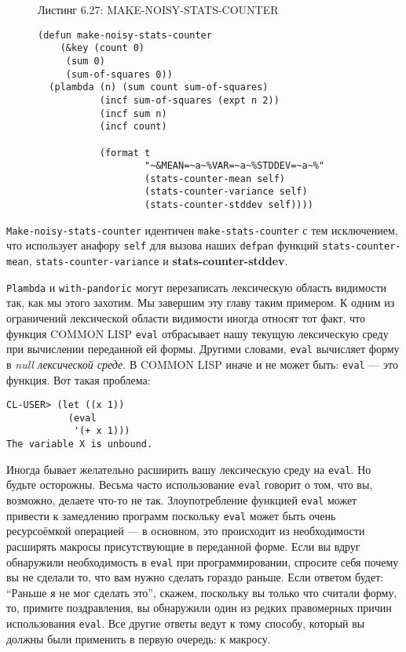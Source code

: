 \begin{figure}Листинг 6.27: MAKE-NOISY-STATS-COUNTER\label{listing_6.27}
\listbegin
\begin{verbatim}
(defun make-noisy-stats-counter
    (&key (count 0)
     (sum 0)
     (sum-of-squares 0))
  (plambda (n) (sum count sum-of-squares)
           (incf sum-of-squares (expt n 2))
           (incf sum n)
           (incf count)
           
           (format t
                   "~&MEAN=~a~%VAR=~a~%STDDEV=~a~%"
                   (stats-counter-mean self)
                   (stats-counter-variance self)
                   (stats-counter-stddev self))))
\end{verbatim}
\listend
\end{figure}

\verb"Make-noisy-stats-counter" идентичен \verb"make-stats-counter" с тем исключением, что использует анафору \verb"self" для вызова наших \verb"defpan" функций \verb"stats-counter-mean", \verb"stats-counter-variance" и \foreignlanguage{english}{\textbf{stats\--\-coun\-ter\--\-std\-dev}}.

\verb"Plambda" и \verb"with-pandoric" могут перезаписать лексическую область видимости так, как мы этого захотим. Мы завершим эту главу таким примером. К одним из ограничений лексической области видимости иногда относят тот факт, что функция COMMON LISP \verb"eval" отбрасывает нашу текущую лексическую среду при вычислении переданной ей формы. Другими словами, \verb"eval" вычисляет форму в \emph{null лексической среде}. В COMMON LISP иначе и не может быть: \verb"eval" --- это функция. Вот такая проблема:

\begin{verbatim}
CL-USER> (let ((x 1))
           (eval
            '(+ x 1)))
The variable X is unbound.
\end{verbatim}

Иногда бывает желательно расширить вашу лексическую среду на \verb"eval". Но будьте осторожны. Весьма часто использование \verb"eval" говорит о том, что вы, возможно, делаете что-то не так. Злоупотребление функцией \verb"eval" может привести к замедлению программ поскольку \verb"eval" может быть очень ресурсоёмкой операцией --- в основном, это происходит из необходимости расширять макросы присутствующие в переданной форме. Если вы вдруг обнаружили необходимость в \verb"eval" при программировании, спросите себя почему вы не сделали то, что вам нужно сделать гораздо раньше. Если ответом будет: ``Раньше я не мог сделать это'', скажем, поскольку вы только что считали форму, то, примите поздравления, вы обнаружили один из редких правомерных причин использования \verb"eval". Все другие ответы ведут к тому способу, который вы должны были применить в первую очередь: к макросу.

